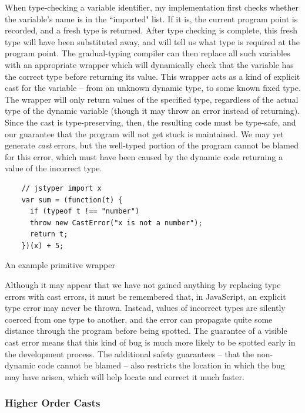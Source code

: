 \documentclass[12pt,a4paper,twoside,openright]{report}
\theoremstyle{definition}
\theoremstyle{dotless}
\begin{document}
When type-checking a variable identifier, my implementation first checks
whether the variable's name is in the ``imported" list. If it is, the current
program point is recorded, and a fresh type is returned. After type checking is
complete, this fresh type will have been substituted away, and will tell us
what type is required at the program point. The gradual-typing compiler can
then replace all such variables with an appropriate wrapper which will
dynamically check that the variable has the correct type before
returning its value.  This wrapper acts as a kind of explicit cast for the
variable -- from an unknown dynamic type, to some known fixed type. The wrapper
will only return values of the specified type, regardless of the actual type of
the dynamic variable (though it may throw an error instead of returning).
Since the cast is type-preserving, then, the resulting code must be type-safe,
and our guarantee that the program will not get stuck is maintained. We may yet
generate \textit{cast} errors,
but the well-typed portion of the program cannot be blamed for this error,
which must have been caused by the dynamic code returning a value of the
incorrect type. 

\begin{program}
  \begin{verbatim}
	// jstyper import x
	var sum = (function(t) {
	  if (typeof t !== "number") 
	  throw new CastError("x is not a number");
	  return t;
	})(x) + 5;
  \end{verbatim}
  \caption{An example primitive wrapper}\label{lst:importPrim}
\end{program}
Although it may appear that we have not gained anything by replacing type
errors with cast errors, it must be remembered that, in JavaScript, an explicit
type error may never be thrown. Instead, values of incorrect types are silently
coerced from one type to another, and the error can propagate quite some
distance through the program before being spotted. The guarantee of a visible
cast error means that this kind of bug is much more likely to be spotted early
in the development process. The additional safety guarantees -- that the
non-dynamic code cannot be blamed -- also restricts the location in which the bug
may have arisen, which will help locate and correct it much faster.

\subsubsection*{Higher Order Casts}
\end{document}

